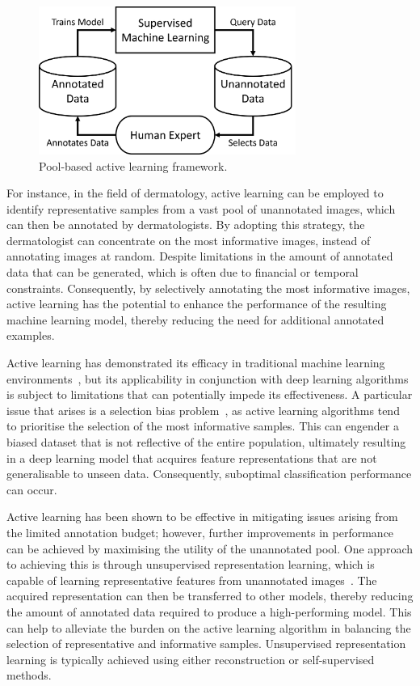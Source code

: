 \begin{figure}[h]
	\centering
	\includegraphics[width=0.75\textwidth]{images/active_learning.png}
	\caption{Pool-based active learning framework.}
	\label{fig:pool_based_active_learning}
\end{figure}

For instance, in the field of dermatology, active learning can be employed to identify representative samples from a vast pool of unannotated images, which can then be annotated by dermatologists. By adopting this strategy, the dermatologist can concentrate on the most informative images, instead of annotating images at random. Despite limitations in the amount of annotated data that can be generated, which is often due to financial or temporal constraints. Consequently, by selectively annotating the most informative images, active learning has the potential to enhance the performance of the resulting machine learning model, thereby reducing the need for additional annotated examples.

Active learning has demonstrated its efficacy in traditional machine learning environments~\citep{settles2009active}, but its applicability in conjunction with deep learning algorithms is subject to limitations that can potentially impede its effectiveness. A particular issue that arises is a selection bias problem~\citep{sener2017active}, as active learning algorithms tend to prioritise the selection of the most informative samples. This can engender a biased dataset that is not reflective of the entire population, ultimately resulting in a deep learning model that acquires feature representations that are not generalisable to unseen data. Consequently, suboptimal classification performance can occur.

Active learning has been shown to be effective in mitigating issues arising from the limited annotation budget; however, further improvements in performance can be achieved by maximising the utility of the unannotated pool. One approach to achieving this is through unsupervised representation learning, which is capable of learning representative features from unannotated images~\citep{bengio2013representation}. The acquired representation can then be transferred to other models, thereby reducing the amount of annotated data required to produce a high-performing model. This can help to alleviate the burden on the active learning algorithm in balancing the selection of representative and informative samples. Unsupervised representation learning is typically achieved using either reconstruction or self-supervised methods.

